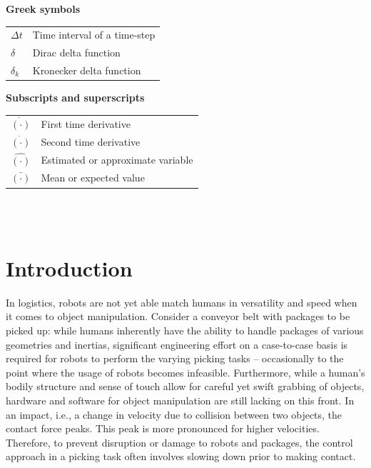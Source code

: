\documentclass[11pt]{report}
\numberwithin{equation}{chapter}		%
\numberwithin{figure}{chapter}			%
\numberwithin{table}{chapter}			%
\begin{document}
	\vspace{0.5cm}
	\noindent\textbf{Greek symbols}\\[3mm]
	\begin{tabularx}{\textwidth}{p{2.5cm}X}
		$\Delta t$         & Time interval of a time-step                   \\
		$\delta$           & Dirac delta function                           \\
		$\delta_k$         & Kronecker delta function                       
	\end{tabularx}

	\vspace{0.5cm}
	\noindent\textbf{Subscripts and superscripts}\\[3mm]
	\begin{tabularx}{\textwidth}{p{2.5cm}X}
		$\dot{(\cdot)}$    & First time derivative                          \\
		$\ddot{(\cdot)}$   & Second time derivative                         \\
		$\hat{(\cdot)}$    & Estimated or approximate variable              \\
		$\bar{(\cdot)}$    & Mean or expected value                         
	\end{tabularx}\\


	\newpage
	\thispagestyle{empty} \ \newpage

	\chapter{Introduction} \label{ch:Intro}
	In logistics, robots are not yet able match humans in versatility and speed when it comes to object manipulation. Consider a conveyor belt with packages to be picked up: while humans inherently have the ability to handle packages of various geometries and inertias, significant engineering effort on a case-to-case basis is required for robots to perform the varying picking tasks -- occasionally to the point where the usage of robots becomes infeasible. Furthermore, while a human's bodily structure and sense of touch allow for careful yet swift grabbing of objects, hardware and software for object manipulation are still lacking on this front. In an impact, i.e., a change in velocity due to collision between two objects, the contact force peaks. This peak is more pronounced for higher velocities. Therefore, to prevent disruption or damage to robots and packages, the control approach in a picking task often involves slowing down prior to making contact.
\end{document}
